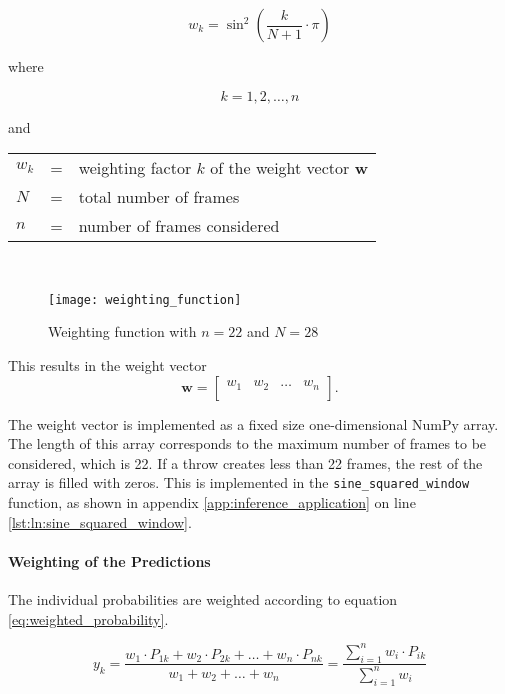 \begin{equation}
  w_k = \sin^2\left(\frac{k}{N+1} \cdot \pi \right)
  \label{eq:weighting_function}
\end{equation}

where

\[
  k = 1, 2, \dots, n
\]

and

\begin{tabular}{lll}
  $w_k$ & = & weighting factor $k$ of the weight vector $\boldsymbol{w}$ \\
  $N$ & = & total number of frames \\
  $n$ & = & number of frames considered \\
\end{tabular}
\\

\begin{figure}
  \centering
  \texttt{[image: weighting\_function]}
  \caption{Weighting function with $n = 22$ and $N = 28$}
  \label{fig:weighting_function}
\end{figure}

This results in the weight vector
\begin{equation}
  \boldsymbol{w} =
  \begin{bmatrix}
    w_{1} & w_{2} & \dots & w_{n} \\
  \end{bmatrix}.
  \label{eq:weight_vector}
\end{equation}

The weight vector is implemented as a fixed size one-dimensional NumPy array.
The length of this array corresponds to the maximum number of frames to be considered, which is \num{22}.
If a throw creates less than \num{22} frames, the rest of the array is filled with zeros.
This is implemented in the \texttt{sine\_squared\_window} function, as shown in appendix \ref{app:inference_application} on line \ref{lst:ln:sine_squared_window}.

\paragraph{Weighting of the Predictions} %
The individual probabilities are weighted according to equation \ref{eq:weighted_probability}.

\begin{equation}
  y_k = \frac{w_1 \cdot P_{1k} + w_2 \cdot P_{2k} + \dots + w_n \cdot P_{nk}}{w_1 + w_2 + \dots + w_n} = \frac{\sum\limits_{i=1}^{n} w_i \cdot P_{ik}}{\sum\limits_{i=1}^{n} w_i}
  \label{eq:weighted_probability}
\end{equation}

